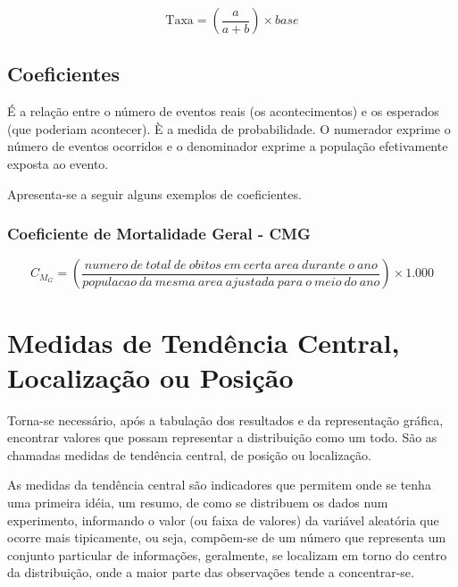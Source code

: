 $$ 
\mbox{Taxa} = \left( \frac{a}{a+b} \right) \times base
$$



\subsection{Coeficientes}

É a relação entre o número de eventos reais (os acontecimentos) e os esperados (que poderiam acontecer). È a medida de probabilidade. O numerador exprime o número de eventos ocorridos e o denominador exprime a população efetivamente exposta ao evento.\vskip0.3cm

Apresenta-se a seguir alguns exemplos de coeficientes.

\subsubsection{Coeficiente de Mortalidade Geral - CMG}

$$
C_{M_{G}} = \left(  \frac{numero \ de \ total \ de \ obitos \ em \ certa \ area \ durante \ o \ ano}{populacao \ da \ mesma \ area \ ajustada \ para \ o \ meio \ do \ ano} \right) \times 1.000
$$











\newpage
\section{Medidas de Tendência Central, Localização ou Posição}

Torna-se necessário, após a tabulação dos resultados e da representação gráfica, encontrar valores que possam representar a distribuição como um todo. São as chamadas medidas de tendência central, de posição ou localização.\vskip0.3cm

As medidas da tendência central são indicadores que permitem onde se tenha uma primeira idéia, um resumo, de como se distribuem os dados num experimento, informando o valor (ou faixa de valores) da variável aleatória que ocorre mais tipicamente, ou seja, compõem-se de um número que representa um conjunto particular de informações, geralmente, se localizam em torno do centro da distribuição, onde a maior parte das observações tende a concentrar-se.





